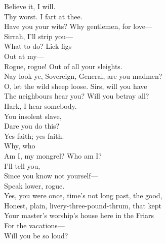 \documentclass[a4paper,oneside,12pt]{memoir}
\begin{document}
\begin{drama*}

\item \xspace

\act

\scene

\facespeaks Believe it, I will.\\
\subtlespeaks {} Thy worst. I fart at thee.\\
\dolspeaks Have you your wits? Why gentlemen, for love---\\
\facespeaks Sirrah, I'll strip you---\\
\subtlespeaks {} What to do? Lick figs\\
Out at my---\\
\facespeaks {} Rogue, rogue! Out of all your sleights.\\
\dolspeaks Nay look ye, Sovereign, General, are you madmen?\\
\subtlespeaks O, let the wild sheep loose.
\dolspeaks {} Sirs, will you have\\
The neighbours hear you? Will you betray all?\\
Hark, I hear somebody.\\
\facespeaks {} You insolent slave,\\
Dare you do this?\\
\subtlespeaks {} Yes faith; yes faith.\\
\facespeaks {} Why, who\\
Am I, my mongrel? Who am I?\\
\subtlespeaks {} I'll tell you,\\
Since you know not yourself---\\
\facespeaks {} Speak lower, rogue.\\
\subtlespeaks Yes, you were once, time's not long past, the good,\\
Honest, plain, livery-three-pound-thrum, that kept\\
Your master's worship's house here in the Friars\\
For the vacations---\\
\facespeaks {} Will you be so loud?\\

\end{drama*}
\end{document}
